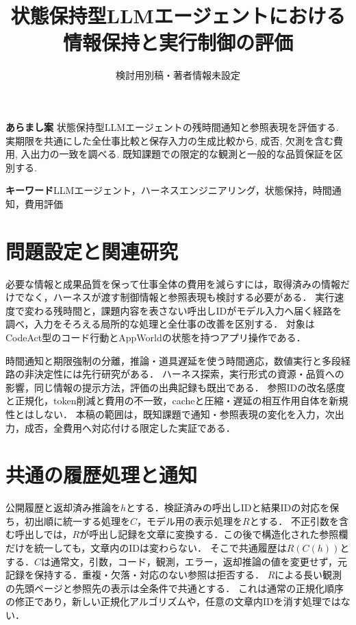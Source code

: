\documentclass[uplatex,a4paper,twocolumn,10pt]{jsarticle}
\title{状態保持型LLMエージェントにおける\newline 情報保持と実行制御の評価}
\author{検討用別稿・著者情報未設定}
\date{}
\begin{document}
\raggedbottom
\maketitle
\noindent\textbf{あらまし案}\quad
状態保持型LLMエージェントの残時間通知と参照表現を評価する. 実期限を共通にした全仕事比較と保存入力の生成比較から, 成否, 欠測を含む費用, 入出力の一致を調べる. 既知課題での限定的な観測と一般的な品質保証を区別する.

\noindent\textbf{キーワード}\quad LLMエージェント，ハーネスエンジニアリング，状態保持，時間通知，費用評価

\section{問題設定と関連研究}
必要な情報と成果品質を保って仕事全体の費用を減らすには，取得済みの情報だけでなく，ハーネスが渡す制御情報と参照表現も検討する必要がある．
実行速度で変わる残時間と，課題内容を表さない呼出しIDがモデル入力へ届く経路を調べ，入力をそろえる局所的な処理と全仕事の改善を区別する．
対象はCodeAct\cite{codeact}型のコード行動とAppWorld\cite{appworld}の状態を持つアプリ操作である．

時間通知と期限強制の分離\cite{clock}，推論・道具遅延を使う時間適応\cite{timely}，数値実行と多段経路の非決定性\cite{nondeterminism,consistency}には先行研究がある．
ハーネス探索\cite{beyondprompts}，実行形式の資源・品質への影響\cite{localprotocol}，同じ情報の提示方法\cite{delivery}，評価の出典記録\cite{repro}も既出である．
参照IDの改名感度と正規化\cite{canonical}，token削減と費用の不一致\cite{costproxy}，cacheと圧縮・遅延の相互作用\cite{capc,cacheeval}自体を新規性とはしない．
本稿の範囲は，既知課題で通知・参照表現の変化を入力，次出力，成否，全費用へ対応付ける限定した実証である．

\section{共通の履歴処理と通知}
公開履歴と返却済み推論を$h$とする．検証済みの呼出しIDと結果IDの対応を保ち，初出順に統一する処理を$C$，モデル用の表示処理を$R$とする．
不正引数を含む呼出しでは，$R$が呼出し記録を文章に変換する．この後で構造化された参照欄だけを統一しても，文章内のIDは変わらない．
そこで共通履歴は$R(C(h))$とする．$C$は通常文，引数，コード，観測，エラー，返却推論の値を変更せず，元記録を保持する．重複・欠落・対応のない参照は拒否する．
$R$による長い観測の先頭ページと参照先の表示は全条件で共通とする．
これは通常の正規化順序の修正であり，新しい正規化アルゴリズムや，任意の文章内IDを消す処理ではない．
\end{document}
